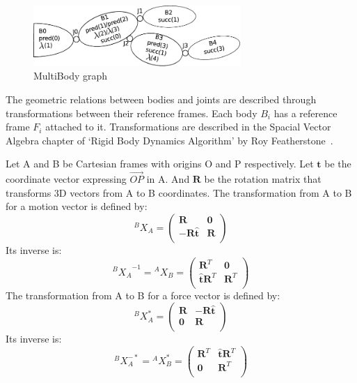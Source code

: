 \begin{figure}
  \centering
  \includegraphics[width=0.7\textwidth]{mbg.pdf}
  \caption{MultiBody graph}
\label{fig:mbg}
\end{figure}

The geometric relations between bodies and joints are described through transformations between their reference frames. Each body $B_i$ has a reference frame $F_i$ attached to it. Transformations are described in the Spacial Vector Algebra chapter of `Rigid Body Dynamics Algorithm' by Roy Featherstone~\cite{featherstone:book:2007}.

Let A and B be Cartesian frames with origins O and P respectively. Let $\mathbf{t}$ be the coordinate vector expressing $\overrightarrow{OP}$ in A. And $\mathbf{R}$ be the rotation matrix that transforms 3D vectors from A to B coordinates.
The transformation from A to B for a motion vector is defined by:
\begin{equation}
  {}^B X_A =
  \begin{pmatrix}
    \mathbf{R} & \mathbf{0} \\
    -\mathbf{R}\hat{\mathbf{t}} & \mathbf{R} \\
  \end{pmatrix}
\end{equation}
Its inverse is:
\begin{equation}
  {{}^B X_A}^{-1} = {}^A X_B =
  \begin{pmatrix}
    \mathbf{R}^T & \mathbf{0} \\
    \hat{\mathbf{t}}\mathbf{R}^T & \mathbf{R}^T \\
  \end{pmatrix}
\end{equation}
The transformation from A to B for a force vector is defined by:
\begin{equation}
  {}^B X_A^* =
  \begin{pmatrix}
    \mathbf{R} & -\mathbf{R}\hat{\mathbf{t}} \\
    \mathbf{0} & \mathbf{R} \\
  \end{pmatrix}
\end{equation}
Its inverse is:
\begin{equation}
  {}^B X_A^{-*} = {}^A X_B^* =
  \begin{pmatrix}
    \mathbf{R}^T & \hat{\mathbf{t}}\mathbf{R}^T \\
    \mathbf{0} & \mathbf{R}^T \\
  \end{pmatrix}
\end{equation}

